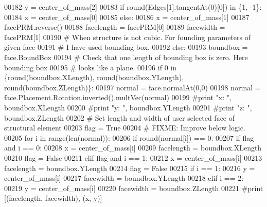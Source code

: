 \begin{DoxyCode}
00182             y = center\_of\_mass[2]
00183             \textcolor{keywordflow}{if} round(Edges[1].tangentAt(0)[0]) \textcolor{keywordflow}{in} \{1, -1\}:
00184                 x = center\_of\_mass[0]
00185             \textcolor{keywordflow}{else}:
00186                 x = center\_of\_mass[1]
00187             facePRM.reverse()
00188         facelength = facePRM[0]
00189         facewidth = facePRM[1]
00190     \textcolor{comment}{# When structure is not cubic. For founding parameters of given face}
00191     \textcolor{comment}{# I have used bounding box.}
00192     \textcolor{keywordflow}{else}:
00193         boundbox = face.BoundBox
00194         \textcolor{comment}{# Check that one length of bounding box is zero. Here bounding box}
00195         \textcolor{comment}{# looks like a plane.}
00196         \textcolor{keywordflow}{if} 0 \textcolor{keywordflow}{in} \{round(boundbox.XLength), round(boundbox.YLength), round(boundbox.ZLength)\}:
00197             normal = face.normalAt(0,0)
00198             normal = face.Placement.Rotation.inverted().multVec(normal)
00199             \textcolor{comment}{#print "x: ", boundbox.XLength}
00200             \textcolor{comment}{#print "y: ", boundbox.YLength}
00201             \textcolor{comment}{#print "z: ", boundbox.ZLength}
00202             \textcolor{comment}{# Set length and width of user selected face of structural element}
00203             flag = \textcolor{keyword}{True}
00204             \textcolor{comment}{# FIXME: Improve below logic.}
00205             \textcolor{keywordflow}{for} i \textcolor{keywordflow}{in} range(len(normal)):
00206                 \textcolor{keywordflow}{if} round(normal[i]) == 0:
00207                     \textcolor{keywordflow}{if} flag \textcolor{keywordflow}{and} i == 0:
00208                         x = center\_of\_mass[i]
00209                         facelength =  boundbox.XLength
00210                         flag = \textcolor{keyword}{False}
00211                     \textcolor{keywordflow}{elif} flag \textcolor{keywordflow}{and} i == 1:
00212                         x = center\_of\_mass[i]
00213                         facelength = boundbox.YLength
00214                         flag = \textcolor{keyword}{False}
00215                     \textcolor{keywordflow}{if} i == 1:
00216                         y = center\_of\_mass[i]
00217                         facewidth = boundbox.YLength
00218                     \textcolor{keywordflow}{elif} i == 2:
00219                         y = center\_of\_mass[i]
00220                         facewidth = boundbox.ZLength
00221             \textcolor{comment}{#print [(facelength, facewidth), (x, y)]}

\end{DoxyCode}
